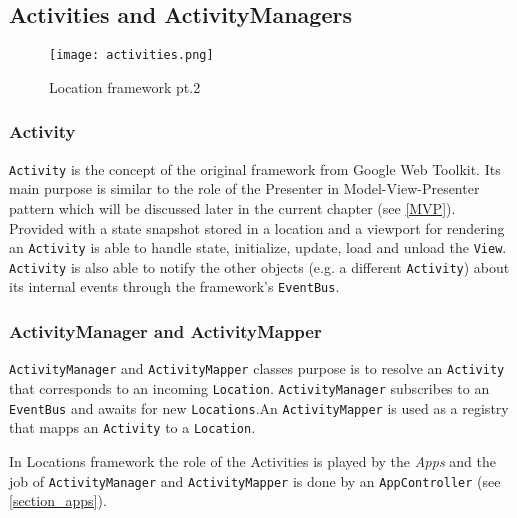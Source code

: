 \subsection{Activities and ActivityManagers}
\begin{figure}[H] \centering \texttt{[image: activities.png]}
	\caption{Location framework pt.2}
	\label{fig:location_arch}
\end{figure}

\subsubsection{Activity}
\texttt{Activity} is the concept of the original framework from Google Web
Toolkit. Its main purpose is similar to the role of the Presenter in
Model-View-Presenter pattern which will be discussed later in the current
chapter (see \ref{MVP}). Provided with a state snapshot stored in a location and
a viewport for rendering an \texttt{Activity} is able to handle state,
initialize, update, load and unload the \texttt{View}\cite{activities_places}.
\texttt{Activity} is also able to notify the other objects (e.g. a different
\texttt{Activity}) about its internal events through the framework's
\texttt{EventBus}.
 
\subsubsection{ActivityManager and ActivityMapper}
\texttt{ActivityManager} and \texttt{ActivityMapper} classes purpose is to
resolve an
\texttt{Activity} that corresponds to an incoming \texttt{Location}.
\texttt{ActivityManager} subscribes to an \texttt{EventBus} and awaits for new
\texttt{Locations}.An \texttt{ActivityMapper} is used as a registry that mapps 
an \texttt{Activity} to a \texttt{Location}.

In Locations framework the role of the Activities is played by the
\emph{Apps} and the job of \texttt{ActivityManager}
and \texttt{ActivityMapper} is done by an \texttt{AppController} (see \ref{section_apps}).


 